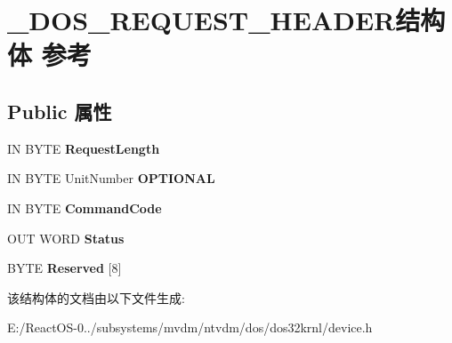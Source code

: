 \hypertarget{struct___d_o_s___r_e_q_u_e_s_t___h_e_a_d_e_r}{}\section{\+\_\+\+D\+O\+S\+\_\+\+R\+E\+Q\+U\+E\+S\+T\+\_\+\+H\+E\+A\+D\+E\+R结构体 参考}
\label{struct___d_o_s___r_e_q_u_e_s_t___h_e_a_d_e_r}
\subsection*{Public 属性}
\begin{DoxyCompactItemize}
\item 
\mbox{\label{struct___d_o_s___r_e_q_u_e_s_t___h_e_a_d_e_r_a20f4670666bdc55bb19047ce6aca5052}} 
IN B\+Y\+TE {\bfseries Request\+Length}
\item 
\mbox{\label{struct___d_o_s___r_e_q_u_e_s_t___h_e_a_d_e_r_a15fa34e78b6a3b00793cf6be33109658}} 
IN B\+Y\+TE Unit\+Number {\bfseries O\+P\+T\+I\+O\+N\+AL}
\item 
\mbox{\label{struct___d_o_s___r_e_q_u_e_s_t___h_e_a_d_e_r_ac143c839ae2b6845ef68352bd132de98}} 
IN B\+Y\+TE {\bfseries Command\+Code}
\item 
\mbox{\label{struct___d_o_s___r_e_q_u_e_s_t___h_e_a_d_e_r_a5cd98b2d2eb2be92dd91bbd0c430dc7b}} 
O\+UT W\+O\+RD {\bfseries Status}
\item 
\mbox{\label{struct___d_o_s___r_e_q_u_e_s_t___h_e_a_d_e_r_a41e82c1c5f989d29a7b8941bd3dfbed4}} 
B\+Y\+TE {\bfseries Reserved} \mbox{[}8\mbox{]}
\end{DoxyCompactItemize}


该结构体的文档由以下文件生成\+:\begin{DoxyCompactItemize}
\item 
E\+:/\+React\+O\+S-\/0../subsystems/mvdm/ntvdm/dos/dos32krnl/device.\+h\end{DoxyCompactItemize}

